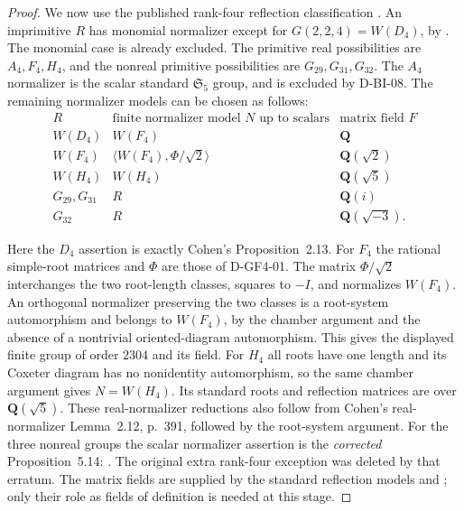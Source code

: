 \begin{proof}
We now use the published rank-four reflection classification
\cite[Theorem~5.12, p.~435]{FIELD:Cohen}.  An imprimitive $R$ has
monomial normalizer except for $G(2,2,4)=W(D_4)$, by
\cite[Proposition~2.13, pp.~391--392]{FIELD:Cohen}.  The monomial
case is already excluded.  The primitive real possibilities are
$A_4,F_4,H_4$, and the nonreal primitive possibilities are
$G_{29},G_{31},G_{32}$.  The $A_4$ normalizer is the scalar
standard $\mathfrak S_5$ group, and is excluded by D-BI-08.
The remaining normalizer models can be chosen as follows:
\[
\begin{array}{c|c|c}
 R&\text{finite normalizer model }N\text{ up to scalars}
                                      &\text{matrix field }F\\\hline
 W(D_4)&W(F_4)&\mathbf Q\\
 W(F_4)&\langle W(F_4),\Phi/\sqrt2\rangle&\mathbf Q(\sqrt2)\\
 W(H_4)&W(H_4)&\mathbf Q(\sqrt5)\\
 G_{29},G_{31}&R&\mathbf Q(i)\\
 G_{32}&R&\mathbf Q(\sqrt{-3}).
\end{array}                                                    \tag{BI.28}
\]

Here the $D_4$ assertion is exactly Cohen's Proposition~2.13.
For $F_4$ the rational simple-root matrices and $\Phi$ are those
of D-GF4-01.  The matrix $\Phi/\sqrt2$ interchanges the two
root-length classes, squares to $-I$, and normalizes $W(F_4)$.
An orthogonal normalizer preserving the two classes is a root-system
automorphism and belongs to $W(F_4)$, by the chamber argument and
the absence of a nontrivial oriented-diagram automorphism.  This
gives the displayed finite group of order $2304$ and its field.
For $H_4$ all roots have one length and its Coxeter diagram has
no nonidentity automorphism, so the same chamber argument gives
$N=W(H_4)$.  Its standard roots and reflection matrices are over
$\mathbf Q(\sqrt5)$.  These real-normalizer reductions also follow
from Cohen's real-normalizer Lemma~2.12, p.~391, followed by the
root-system argument.  For the three nonreal groups the scalar
normalizer assertion is the \emph{corrected} Proposition~5.14:
\cite[p.~435]{FIELD:Cohen}\cite[p.~613]{FIELD:CohenErr}.
The original extra rank-four exception was deleted by that erratum.
The matrix fields are supplied by the standard reflection models
and \cite[Table~8.2, pp.~675--676]{FIELD:Malle}; only their role
as fields of definition is needed at this stage.


\end{proof}

